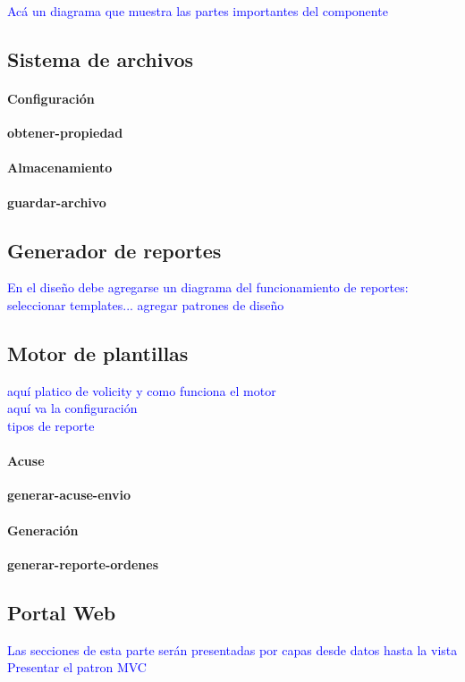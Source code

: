 \textcolor{blue}{
	Acá un diagrama que muestra las partes importantes del componente
}

\subsection{Sistema de archivos}
	\paragraph{Configuración\\}
		\textbf{obtener-propiedad}
	\paragraph{Almacenamiento\\}
		\textbf{guardar-archivo}


\subsection{Generador de reportes}

\textcolor{blue}{En el diseño debe agregarse un diagrama del funcionamiento de reportes: seleccionar templates... agregar patrones de diseño}\\
\subsection{Motor de plantillas}
\textcolor{blue}{aquí platico de volicity y como funciona el motor}\\
\textcolor{blue}{aquí va la configuración}\\
\textcolor{blue}{tipos de reporte}

	\paragraph{Acuse\\}
		\textbf{generar-acuse-envio}
	\paragraph{Generación\\}
 		\textbf{generar-reporte-ordenes}


\subsection{Portal Web}
\textcolor{blue}{Las secciones de esta parte serán presentadas por capas desde datos hasta la vista}\\
\textcolor{blue}{Presentar el patron MVC}\\
